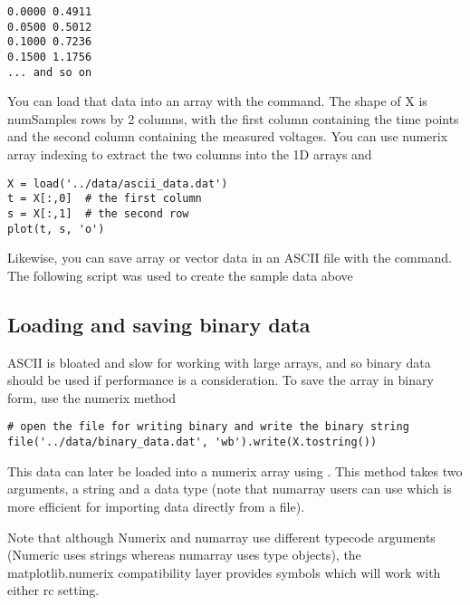 \documentclass[twoside]{book}
\begin{document}
\begin{verbatim}
0.0000 0.4911
0.0500 0.5012
0.1000 0.7236
0.1500 1.1756
... and so on
\end{verbatim}

\noindent You can load that data into an array  with the 
command.  The shape of X is numSamples rows by 2 columns, with the
first column containing the time points and the second column
containing the measured voltages.  You can use numerix array indexing
to extract the two columns into the 1D arrays  and 

\begin{lstlisting}
X = load('../data/ascii_data.dat')
t = X[:,0]  # the first column
s = X[:,1]  # the second row
plot(t, s, 'o')
\end{lstlisting}

Likewise, you can save array or vector data in an ASCII file
with the  command.  The following script was used to create
the sample data above



\subsection{Loading and saving binary data}
\label{sec:binary_data}

ASCII is bloated and slow for working with large arrays, and so binary
data should be used if performance is a consideration.  To save the
array  in binary form, use the numerix  method

\begin{lstlisting}
# open the file for writing binary and write the binary string
file('../data/binary_data.dat', 'wb').write(X.tostring())
\end{lstlisting}

\noindent This data can later be loaded into a numerix array using
.  This method takes two arguments, a string and a
data type (note that numarray users can use  which is
more efficient for importing data directly from a file).  



\noindent Note that although Numerix and numarray use different
typecode arguments (Numeric uses strings whereas numarray uses type
objects), the matplotlib.numerix compatibility layer provides symbols
which will work with either  rc setting.
\end{document}
